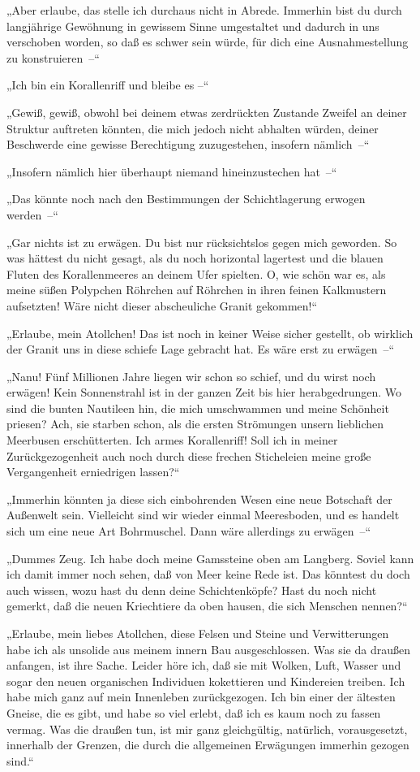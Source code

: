 „Aber erlaube, das stelle ich durchaus nicht in Abrede. Immerhin
bist du durch langjährige Gewöhnung in gewissem Sinne umgestaltet
und dadurch in uns verschoben worden, so daß es schwer sein würde,
für dich eine Ausnahmestellung zu konstruieren~–“

„Ich bin ein Korallenriff und bleibe es –“

„Gewiß, gewiß, obwohl bei deinem etwas zerdrückten Zustande Zweifel
an deiner Struktur auftreten könnten, die mich jedoch nicht
abhalten würden, deiner Beschwerde eine gewisse Berechtigung
zuzugestehen, insofern nämlich~–“

„Insofern nämlich hier überhaupt niemand hineinzustechen hat~–“

„Das könnte noch nach den Bestimmungen der Schichtlagerung erwogen
werden~–“

„Gar nichts ist zu erwägen. Du bist nur rücksichtslos gegen mich
geworden. So was hättest du nicht gesagt, als du noch horizontal
lagertest und die blauen Fluten des Korallenmeeres an deinem Ufer
spielten. O, wie schön war es, als meine süßen Polypchen Röhrchen
auf Röhrchen in ihren feinen Kalkmustern aufsetzten! Wäre nicht
dieser abscheuliche Granit gekommen!“

„Erlaube, mein Atollchen! Das ist noch in keiner Weise sicher
gestellt, ob wirklich der Granit uns in diese schiefe Lage gebracht
hat. Es wäre erst zu erwägen~–“

„Nanu! Fünf Millionen Jahre liegen wir schon so schief, und du
wirst noch erwägen! Kein Sonnenstrahl ist in der ganzen Zeit bis
hier herabgedrungen. Wo sind die bunten Nautileen hin, die mich
umschwammen und meine Schönheit priesen? Ach, sie starben schon,
als die ersten Strömungen unsern lieblichen Meerbusen
erschütterten. Ich armes Korallenriff! Soll ich in meiner
Zurückgezogenheit auch noch durch diese frechen Sticheleien meine
große Vergangenheit erniedrigen lassen?“

„Immerhin könnten ja diese sich einbohrenden Wesen eine neue
Botschaft der Außenwelt sein. Vielleicht sind wir wieder einmal
Meeresboden, und es handelt sich um eine neue Art Bohrmuschel. Dann
wäre allerdings zu erwägen~–“

„Dummes Zeug. Ich habe doch meine Gamssteine oben am Langberg.
Soviel kann ich damit immer noch sehen, daß von Meer keine Rede
ist. Das könntest du doch auch wissen, wozu hast du denn deine
Schichtenköpfe? Hast du noch nicht gemerkt, daß die neuen
Kriechtiere da oben hausen, die sich Menschen nennen?“

„Erlaube, mein liebes Atollchen, diese Felsen und Steine und
Verwitterungen habe ich als unsolide aus meinem innern Bau
ausgeschlossen. Was sie da draußen anfangen, ist ihre Sache. Leider
höre ich, daß sie mit Wolken, Luft, Wasser und sogar den neuen
organischen Individuen kokettieren und Kindereien treiben. Ich habe
mich ganz auf mein Innenleben zurückgezogen. Ich bin einer der
ältesten Gneise, die es gibt, und habe so viel erlebt, daß ich es
kaum noch zu fassen vermag. Was die draußen tun, ist mir ganz
gleichgültig, natürlich, vorausgesetzt, innerhalb der Grenzen, die
durch die allgemeinen Erwägungen immerhin gezogen sind.“

